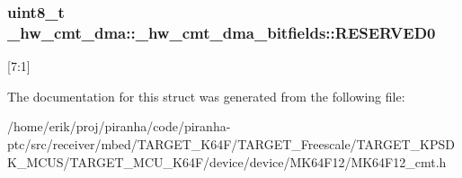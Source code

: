 \subsubsection[{\texorpdfstring{R\+E\+S\+E\+R\+V\+E\+D0}{RESERVED0}}]{\setlength{\rightskip}{0pt plus 5cm}uint8\+\_\+t \+\_\+hw\+\_\+cmt\+\_\+dma\+::\+\_\+hw\+\_\+cmt\+\_\+dma\+\_\+bitfields\+::\+R\+E\+S\+E\+R\+V\+E\+D0}\hypertarget{struct__hw__cmt__dma_1_1__hw__cmt__dma__bitfields_aefecd63097f1547c59ba6845a97083ba}{}\label{struct__hw__cmt__dma_1_1__hw__cmt__dma__bitfields_aefecd63097f1547c59ba6845a97083ba}
\mbox{[}7\+:1\mbox{]} 

The documentation for this struct was generated from the following file\+:\begin{DoxyCompactItemize}
\item 
/home/erik/proj/piranha/code/piranha-\/ptc/src/receiver/mbed/\+T\+A\+R\+G\+E\+T\+\_\+\+K64\+F/\+T\+A\+R\+G\+E\+T\+\_\+\+Freescale/\+T\+A\+R\+G\+E\+T\+\_\+\+K\+P\+S\+D\+K\+\_\+\+M\+C\+U\+S/\+T\+A\+R\+G\+E\+T\+\_\+\+M\+C\+U\+\_\+\+K64\+F/device/device/\+M\+K64\+F12/M\+K64\+F12\+\_\+cmt.\+h\end{DoxyCompactItemize}
